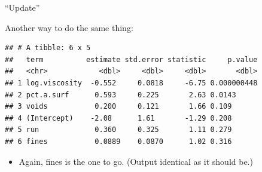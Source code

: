 \documentclass[ignorenonframetext,]{beamer}
\newenvironment{Shaded}{\begin{snugshade}}{\end{snugshade}}
\newcommand{\FloatTok}[1]{\textcolor[rgb]{0.00,0.00,0.81}{#1}}
\newcommand{\KeywordTok}[1]{\textcolor[rgb]{0.13,0.29,0.53}{\textbf{#1}}}
\newcommand{\NormalTok}[1]{#1}
\newcommand{\OperatorTok}[1]{\textcolor[rgb]{0.81,0.36,0.00}{\textbf{#1}}}
\newcommand{\StringTok}[1]{\textcolor[rgb]{0.31,0.60,0.02}{#1}}
\providecommand{\tightlist}{%
  \setlength{\itemsep}{0pt}\setlength{\parskip}{0pt}}
\begin{document}
\begin{frame}[fragile]{``Update''}
\protect\hypertarget{update}{}

Another way to do the same thing:

\begin{Shaded}
\end{Shaded}

\begin{verbatim}
## # A tibble: 6 x 5
##   term          estimate std.error statistic     p.value
##   <chr>            <dbl>     <dbl>     <dbl>       <dbl>
## 1 log.viscosity  -0.552     0.0818     -6.75 0.000000448
## 2 pct.a.surf      0.593     0.225       2.63 0.0143     
## 3 voids           0.200     0.121       1.66 0.109      
## 4 (Intercept)    -2.08      1.61       -1.29 0.208      
## 5 run             0.360     0.325       1.11 0.279      
## 6 fines           0.0889    0.0870      1.02 0.316
\end{verbatim}

\begin{itemize}
\tightlist
\item
  Again, fines is the one to go. (Output identical as it should be.)
\end{itemize}

\end{frame}
\end{document}
